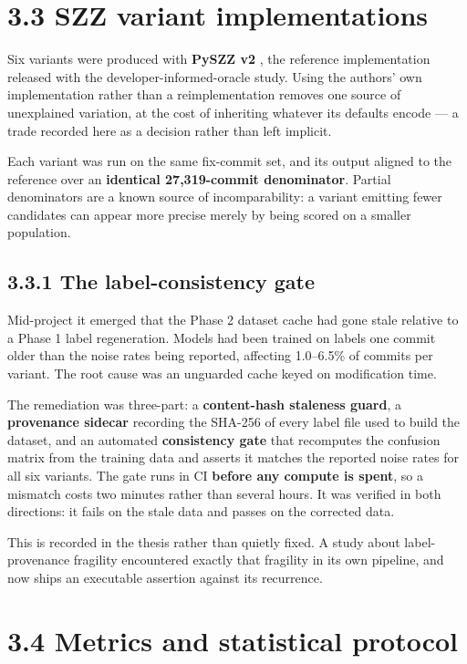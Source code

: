 \section{3.3 SZZ variant
implementations}\label{szz-variant-implementations}

Six variants were produced with \textbf{PySZZ v2}
\citep{rosa2023szzvariants}, the reference implementation released with
the developer-informed-oracle study. Using the authors' own
implementation rather than a reimplementation removes one source of
unexplained variation, at the cost of inheriting whatever its defaults
encode --- a trade recorded here as a decision rather than left
implicit.

Each variant was run on the same fix-commit set, and its output aligned
to the reference over an \textbf{identical 27,319-commit denominator}.
Partial denominators are a known source of incomparability: a variant
emitting fewer candidates can appear more precise merely by being scored
on a smaller population.

\subsection{3.3.1 The label-consistency
gate}\label{the-label-consistency-gate}

Mid-project it emerged that the Phase 2 dataset cache had gone stale
relative to a Phase 1 label regeneration. Models had been trained on
labels one commit older than the noise rates being reported, affecting
1.0--6.5\% of commits per variant. The root cause was an unguarded cache
keyed on modification time.

The remediation was three-part: a \textbf{content-hash staleness guard},
a \textbf{provenance sidecar} recording the SHA-256 of every label file
used to build the dataset, and an automated \textbf{consistency gate}
that recomputes the confusion matrix from the training data and asserts
it matches the reported noise rates for all six variants. The gate runs
in CI \textbf{before any compute is spent}, so a mismatch costs two
minutes rather than several hours. It was verified in both directions:
it fails on the stale data and passes on the corrected data.

This is recorded in the thesis rather than quietly fixed. A study about
label-provenance fragility encountered exactly that fragility in its own
pipeline, and now ships an executable assertion against its recurrence.

\section{3.4 Metrics and statistical
protocol}\label{metrics-and-statistical-protocol}

